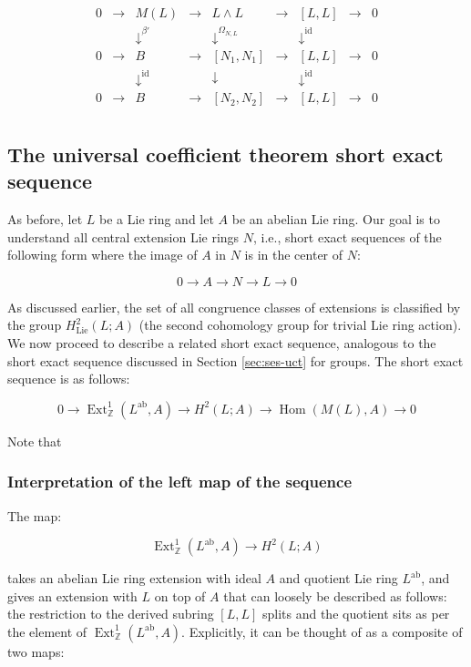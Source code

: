 $$\begin{array}{ccccccccc}
0 & \to & M(L) & \to & L \wedge L & \to & [L,L] & \to & 0\\
 &&   \downarrow^{\beta'}  &&  \downarrow^{\Omega_{N,L}}     && \downarrow^{\text{id}}&& \\
0 & \to & B &\to & [N_1,N_1] & \to & [L,L] & \to & 0\\
 &&   \downarrow^{\operatorname{id}}  && \downarrow && \downarrow^{\text{id}} && \\
0 & \to & B &\to & [N_2,N_2] & \to & [L,L] & \to & 0\\
\end{array}$$

\subsection{The universal coefficient theorem short exact sequence}\label{sec:ses-uct-lie}

As before, let $L$ be a Lie ring and let $A$ be an abelian Lie ring. Our
goal is to understand all central extension Lie rings $N$, i.e., short
exact sequences of the following form where the image of $A$ in $N$ is
in the center of $N$:

$$0 \to A \to N \to L \to 0$$

As discussed earlier, the set of all congruence classes of extensions
is classified by the group $H^2_{\text{Lie}}(L;A)$ (the second
cohomology group for trivial Lie ring action). We now proceed to
describe a related short exact sequence, analogous to the short exact
sequence discussed in Section \ref{sec:ses-uct} for groups. The short exact
sequence is as follows:

\begin{equation}\label{eq:ses-uct-lie}
  0 \to \operatorname{Ext}^1_{\mathbb{Z}}(L^{\operatorname{ab}},A) \to H^2(L;A) \to \operatorname{Hom}(M(L),A) \to 0
\end{equation}

Note that 
\subsubsection{Interpretation of the left map of the sequence}\label{sec:ses-uct-lie-left-map}

The map:

$$\operatorname{Ext}^1_{\mathbb{Z}}(L^{\operatorname{ab}},A) \to H^2(L;A)$$

takes an abelian Lie ring extension with ideal $A$ and quotient Lie
ring $L^{\operatorname{ab}}$, and gives an extension with $L$ on top
of $A$ that can loosely be described as follows: the restriction to
the derived subring $[L,L]$ splits and the quotient sits as per the
element of
$\operatorname{Ext}^1_{\mathbb{Z}}(L^{\operatorname{ab}},A)$. Explicitly,
it can be thought of as a composite of two maps:

